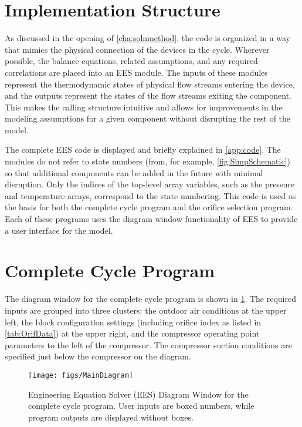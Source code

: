 \section{Implementation Structure} \label{sec:Overall}
As discussed in the opening of \cref{cha:solnmethod}, the code is organized
in a way that mimics the physical connection of the devices in the cycle.
Wherever possible, the balance equations, related assumptions, and any required
correlations are placed into an EES module.
The inputs of these modules represent the thermodynamic states of physical flow streams entering
the device, and the outputs represent the states of the flow streams exiting the component.
This makes the calling structure intuitive and allows for improvements in the
modeling assumptions for a given component without disrupting the rest of the model.

The complete EES code is displayed and briefly explained in \cref{app:code}.
The modules do not refer to state numbers (from, for example, \cref{fig:SimpSchematic})
so that additional components can be added in the future with minimal disruption.
Only the indices of the top-level array variables, such as the pressure and temperature arrays,
correspond to the state numbering.
This code is used as the basis for both the complete cycle program and the 
orifice selection program. 
Each of these programs uses the diagram window functionality of EES
to provide a user interface for the model.

\section{Complete Cycle Program} \label{sec:MainModel}
The diagram window for the complete cycle program is shown in \cref{fig:MainDiag}.
The required inputs are grouped into three clusters: the outdoor air conditions
at the upper left, the block configuration settings (including orifice index
as listed in \cref{tab:OrifData}) at the upper right, and
the compressor operating point parameters to the left of the compressor.
The compressor suction conditions are specified just below the compressor
on the diagram.
\begin{figure}[tbp]
  \centering
  \texttt{[image: figs/MainDiagram]}
  \caption{Engineering Equation Solver (EES) Diagram Window for the complete
    cycle program. User inputs are boxed numbers, while program outputs are displayed without boxes.}
  \label{fig:MainDiag}
\end{figure}


